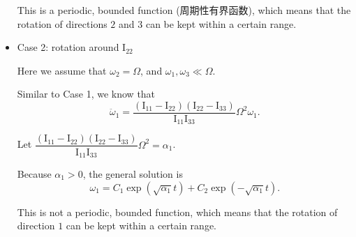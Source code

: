 \begin{itemize}
  This is a periodic, bounded function (周期性有界函数), which means
  that the rotation of directions \(2\) and \(3\) can be kept within a
  certain range.
\item
  Case 2: rotation around \(\mathrm I_{22}\)

  Here we assume that \(\omega_2 = \Omega\), and
  \(\omega_1, \omega_3 \ll \Omega\).

  Similar to Case 1, we know that
  \[\ddot{\omega}_1 = \dfrac{(\mathrm I_{11} - \mathrm I_{22})(\mathrm I_{22} - \mathrm I_{33})}{\mathrm I_{11} \mathrm I_{33}} \Omega^2 \omega_1.\]

  Let
  \(\dfrac{(\mathrm I_{11} - \mathrm I_{22})(\mathrm I_{22} - \mathrm I_{33})}{\mathrm I_{11} \mathrm I_{33}} \Omega^2 = \alpha_1\).

  Because \(\alpha_1 > 0\), the general solution is
  \[\omega_1 = C_1 \exp \left( \sqrt{\alpha_1} t \right) + C_2 \exp \left( - \sqrt{\alpha_1} t \right).\]

  This is not a periodic, bounded function, which means that the
  rotation of direction \(1\) can be kept within a certain range.
\end{itemize}
